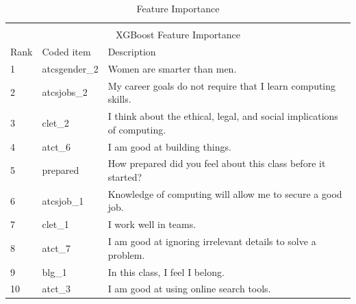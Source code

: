 \setlength{\extrarowheight}{1.5pt}
\begin{table}[!htbp]
\caption{Feature Importance} %
\centering %
\begin{tabular}{|l|l|p{10cm}|} %
\hline %


\multicolumn{3}{|c|}{}\\
\multicolumn{3}{|c|}{XGBoost Feature Importance}\\[5pt]
\hline
Rank & Coded item & Description\\[0.5ex]
\hline %

1 & atcsgender\_2 &  Women are smarter than men. \\
2 & atcsjobs\_2 & My career goals do not require that I learn computing skills. \\
3 & clet\_2 &  I think about the ethical, legal, and social implications of computing.\\
4 & atct\_6 & I am good at building things.\\
5 & prepared & How prepared did you feel about this class before it started? \\
6 & atcsjob\_1 & Knowledge of computing will allow me to secure a good job. \\
7 & clet\_1 & I work well in teams. \\
8 & atct\_7 & I am good at ignoring irrelevant details to solve a problem. \\
9 & blg\_1 & In this class, I feel I belong. \\
10 & atct\_3 &  I am good at using online search tools. \\

\hline%
\end{tabular}
\label{tableFeatureImportance}{}
\end{table}



